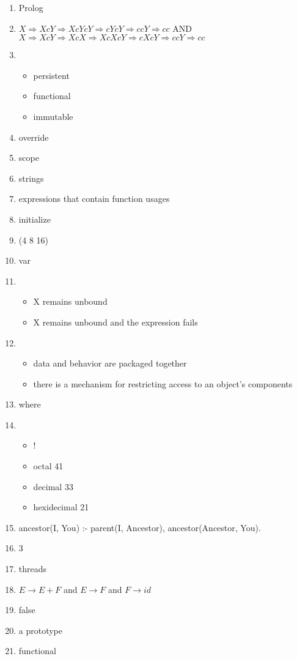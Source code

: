 \documentclass{exam}
\begin{document}
\begin{enumerate}
\item Prolog
\item $X \Rightarrow XcY \Rightarrow XcYcY \Rightarrow cYcY \Rightarrow ccY \Rightarrow cc$ AND $X \Rightarrow XcY \Rightarrow XcX \Rightarrow XcXcY \Rightarrow cXcY \Rightarrow ccY \Rightarrow cc$
\item \begin{itemize}
\item persistent
\item functional
\item immutable
\end{itemize}
\item override
\item scope
\item strings
\item expressions that contain function usages
\item initialize
\item (4 8 16)
\item var
\item \begin{itemize}
\item X remains unbound
\item X remains unbound and the expression fails
\end{itemize}
\item \begin{itemize}
\item data and behavior are packaged together
\item there is a mechanism for restricting access to an object's components
\end{itemize}
\item where
\item \begin{itemize}
\item !
\item octal 41
\item decimal 33
\item hexidecimal 21
\end{itemize}
\item ancestor(I, You) :- parent(I, Ancestor), ancestor(Ancestor, You). 
\item 3
\item threads
\item $E \rightarrow E + F$ and $E \rightarrow F$ and $F \rightarrow id$
\item false
\item a prototype
\item functional

\end{enumerate}
\end{document}
